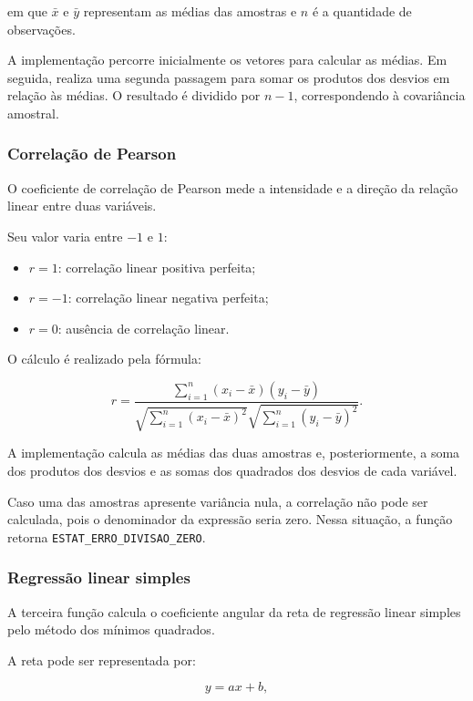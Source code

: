 \documentclass[12pt,a4paper]{article}
\newcommand{\cod}[1]{\texttt{#1}}
\begin{document}
em que $\bar{x}$ e $\bar{y}$ representam as médias das amostras e
$n$ é a quantidade de observações.

A implementação percorre inicialmente os vetores para calcular as médias.
Em seguida, realiza uma segunda passagem para somar os produtos dos
desvios em relação às médias. O resultado é dividido por $n-1$,
correspondendo à covariância amostral.

\subsubsection{Correlação de Pearson}

O coeficiente de correlação de Pearson mede a intensidade e a direção
da relação linear entre duas variáveis.

Seu valor varia entre $-1$ e $1$:
\begin{itemize}
    \item $r = 1$: correlação linear positiva perfeita;
    \item $r = -1$: correlação linear negativa perfeita;
    \item $r = 0$: ausência de correlação linear.
\end{itemize}

O cálculo é realizado pela fórmula:

\begin{equation}
r =
\frac{
\sum_{i=1}^{n}(x_i-\bar{x})(y_i-\bar{y})
}{
\sqrt{\sum_{i=1}^{n}(x_i-\bar{x})^2}
\sqrt{\sum_{i=1}^{n}(y_i-\bar{y})^2}
}.
\end{equation}

A implementação calcula as médias das duas amostras e, posteriormente,
a soma dos produtos dos desvios e as somas dos quadrados dos desvios
de cada variável.

Caso uma das amostras apresente variância nula, a correlação não pode
ser calculada, pois o denominador da expressão seria zero. Nessa
situação, a função retorna \cod{ESTAT\_ERRO\_DIVISAO\_ZERO}.

\subsubsection{Regressão linear simples}

A terceira função calcula o coeficiente angular da reta de regressão
linear simples pelo método dos mínimos quadrados.

A reta pode ser representada por:

\begin{equation}
y = ax + b,
\end{equation}
\end{document}
